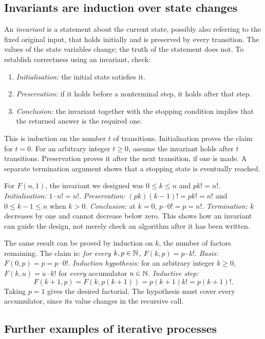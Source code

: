 \subsection{Invariants are induction over state changes}
\label{sec:alg-invariants}

An \emph{invariant} is a statement about the current state, possibly also
referring to the fixed original input, that holds initially and is preserved
by every transition. The values of the state variables change; the truth of
the statement does not. To establish correctness using an invariant, check:
\begin{enumerate}
\item \emph{Initialisation:} the initial state satisfies it.
\item \emph{Preservation:} if it holds before a nonterminal step, it holds
      after that step.
\item \emph{Conclusion:} the invariant together with the stopping condition
      implies that the returned answer is the required one.
\end{enumerate}
This is induction on the number $t$ of transitions. Initialisation proves
the claim for $t=0$. For an arbitrary integer $t\geq0$, assume the
invariant holds after $t$ transitions. Preservation proves it after the
next transition, if one is made. A separate termination argument shows
that a stopping state is eventually reached.

For $F(n,1)$, the invariant we designed was $0\leq k\leq n$ and $pk!=n!$.
\emph{Initialisation:} $1\cdot n!=n!$.
\emph{Preservation:} $(pk)(k-1)!=pk!=n!$ and $0\leq k-1\leq n$ when $k>0$.
\emph{Conclusion:} at $k=0$, $p\cdot0!=p=n!$.
\emph{Termination:} $k$ decreases by one and cannot decrease below zero.
This shows how an invariant can guide the design, not merely check an
algorithm after it has been written.

The same result can be proved by induction on $k$, the number of factors
remaining. The claim is: \emph{for every $k,p\in\mathbb{N}$, $F(k,p)=p\cdot k!$}.
\emph{Basis:} $F(0,p)=p=p\cdot0!$.
\emph{Induction hypothesis:} for an arbitrary integer $k\geq0$,
$F(k,u)=u\cdot k!$ for \emph{every} accumulator $u\in\mathbb{N}$.
\emph{Inductive step:}
\[
F(k+1,p)=F(k,p(k+1))=p(k+1)k!=p(k+1)!.
\]
Taking $p=1$ gives the desired factorial. The hypothesis must cover every
accumulator, since its value changes in the recursive call.

\subsection{Further examples of iterative processes}
\label{sec:alg-iterative-examples}

